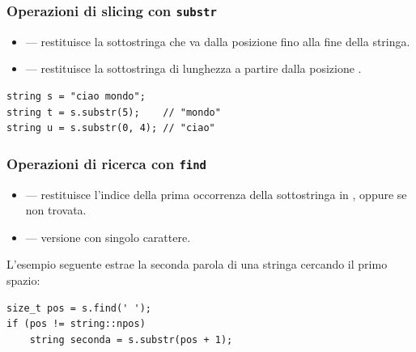\subsubsection{Operazioni di slicing con \texttt{substr}}

\begin{itemize}
    \item {} --- restituisce la sottostringa che va dalla
          posizione  fino alla fine della stringa.
    \item {} --- restituisce la sottostringa di lunghezza
           a partire dalla posizione .
\end{itemize}

\begin{codeexample}
    \begin{codebox}
        \begin{lstlisting}
string s = "ciao mondo";
string t = s.substr(5);    // "mondo"
string u = s.substr(0, 4); // "ciao"
        \end{lstlisting}
    \end{codebox}
\end{codeexample}

\subsubsection{Operazioni di ricerca con \texttt{find}}

\begin{itemize}
    \item {} --- restituisce l'indice della prima occorrenza
          della sottostringa  in , oppure
           se non trovata.
    \item {} --- versione con singolo carattere.
\end{itemize}

L'esempio seguente estrae la seconda parola di una stringa cercando il primo spazio:

\begin{codeexample}
    \begin{codebox}
        \begin{lstlisting}
size_t pos = s.find(' ');
if (pos != string::npos)
    string seconda = s.substr(pos + 1);
        \end{lstlisting}
    \end{codebox}
\end{codeexample}

